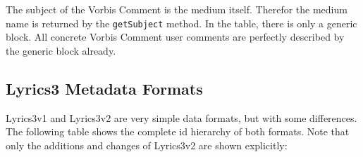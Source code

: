 
The subject of the Vorbis Comment is the medium itself. Therefor the medium name is returned by the \texttt{getSubject} method. In the table, there is only a generic block. All concrete Vorbis Comment user comments are perfectly described by the generic block already.


\subsection{Lyrics3 Metadata Formats}
\label{sec:Lyrics3}

Lyrics3v1 and Lyrics3v2 are very simple data formats, but with some differences. The following table shows the complete id hierarchy of both formats. Note that only the additions and changes of Lyrics3v2 are shown explicitly:


